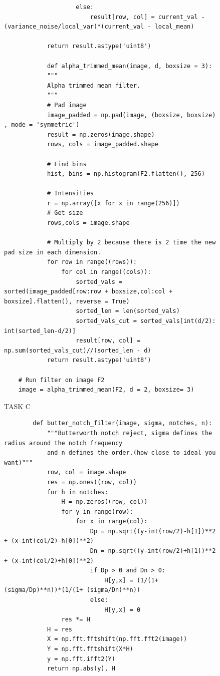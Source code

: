 {\begin{figure}[H]
\begin{lstlisting}
                    else:
                        result[row, col] = current_val - (variance_noise/local_var)*(current_val - local_mean)
            
            return result.astype('uint8')

            def alpha_trimmed_mean(image, d, boxsize = 3):
            """
            Alpha trimmed mean filter.
            """
            # Pad image
            image_padded = np.pad(image, (boxsize, boxsize) , mode = 'symmetric')
            result = np.zeros(image.shape)
            rows, cols = image_padded.shape
    
            # Find bins
            hist, bins = np.histogram(F2.flatten(), 256)
            
            # Intensities
            r = np.array([x for x in range(256)])
            # Get size
            rows,cols = image.shape
    
            # Multiply by 2 because there is 2 time the new pad size in each dimension.
            for row in range((rows)):
                for col in range((cols)):
                    sorted_vals = sorted(image_padded[row:row + boxsize,col:col + boxsize].flatten(), reverse = True)
                    sorted_len = len(sorted_vals)
                    sorted_vals_cut = sorted_vals[int(d/2): int(sorted_len-d/2)]
                    result[row, col] = np.sum(sorted_vals_cut)//(sorted_len - d)
            return result.astype('uint8')
    
    # Run filter on image F2
    image = alpha_trimmed_mean(F2, d = 2, boxsize= 3)
    \end{lstlisting}
\caption{TASK C}
\label{TASK C}
\end{figure}




\begin{figure}[H]
    \begin{lstlisting}
        def butter_notch_filter(image, sigma, notches, n):
            """Butterworth notch reject, sigma defines the radius around the notch frequency
            and n defines the order.(how close to ideal you want)"""
            row, col = image.shape
            res = np.ones((row, col))
            for h in notches:
                H = np.zeros((row, col))
                for y in range(row):
                    for x in range(col):
                        Dp = np.sqrt((y-int(row/2)-h[1])**2 + (x-int(col/2)-h[0])**2)
                        Dn = np.sqrt((y-int(row/2)+h[1])**2 + (x-int(col/2)+h[0])**2)
                        if Dp > 0 and Dn > 0:
                            H[y,x] = (1/(1+ (sigma/Dp)**n))*(1/(1+ (sigma/Dn)**n))
                        else:
                            H[y,x] = 0
                res *= H
            H = res
            X = np.fft.fftshift(np.fft.fft2(image))
            Y = np.fft.fftshift(X*H)
            y = np.fft.ifft2(Y)
            return np.abs(y), H


\end{lstlisting}
\end{figure}}
